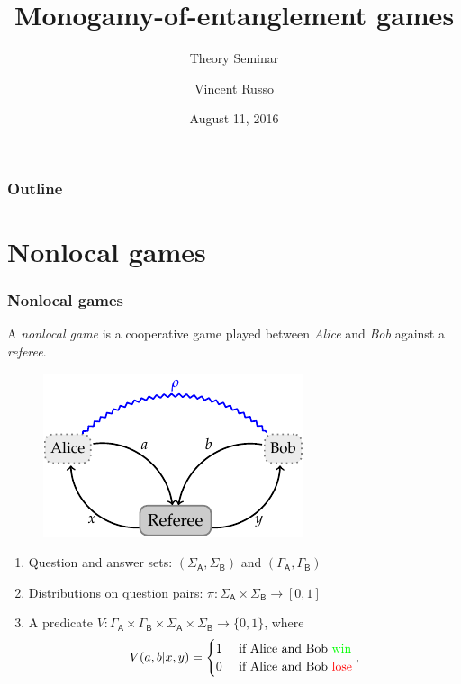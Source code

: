 \documentclass{beamer}
\title{Monogamy-of-entanglement games}
\subtitle{Theory Seminar}
\author[V. Russo]{Vincent Russo}
\institute[UWaterloo]{University of Waterloo}
\date{August 11, 2016}
\def \GammaA{\Gamma_{\reg{A}}}
\def \GammaB{\Gamma_{\reg{B}}}
\def \SigmaA{\Sigma_{\reg{A}}}
\def \SigmaB{\Sigma_{\reg{B}}}
\newcommand{\reg}[1]{\mathsf{#1}}
\begin{document}
  {%
    \frame{\titlepage}
  }

  \beamertemplatenavigationsymbolsempty

  \begin{frame}
    \frametitle{Outline}
    \tableofcontents%
  \end{frame}

  \section{Nonlocal games}

\begin{frame}
	\frametitle{Nonlocal games}
	A \emph{nonlocal game} is a cooperative game played between \emph{Alice} and \emph{Bob} against a \emph{referee}. 
	\begin{figure}[!htpb] \label{fig:nonlocal-game}
	\begin{center}
		\includegraphics[scale=1.0]{figures/nonlocal_game.pdf}
	\end{center}
\end{figure}
	\begin{enumerate}
		\item Question and answer sets: $(\SigmaA, \SigmaB)$ and $(\GammaA, \GammaB)$
		\item Distributions on question pairs: $\pi: \SigmaA \times \SigmaB \rightarrow [0,1]$ 
		\item A predicate $V : \GammaA \times \GammaB \times \SigmaA \times \SigmaB \rightarrow \{0,1\}$, where 
\[
 V(a,b|x,y) =
  \begin{cases} 
      \hfill 1 \hfill & \text{ if Alice and Bob \textcolor{green}{win}} \\
      \hfill 0 \hfill & \text{ if Alice and Bob \textcolor{red}{lose}} \\
  \end{cases},
\]			
	\end{enumerate}
\end{frame}
\end{document}
